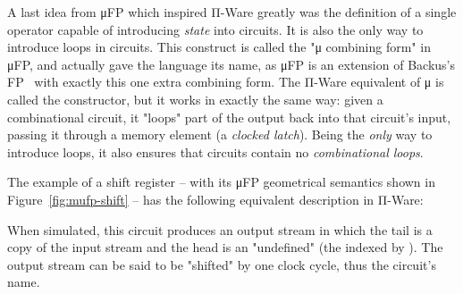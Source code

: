         A last idea from μFP which inspired Π-Ware greatly was the definition of a
        single operator capable of introducing \emph{state} into circuits.
        It is also the only way to introduce loops in circuits.
        This construct is called the "μ combining form" in μFP, and actually gave the language its name,
        as μFP is an extension of Backus's FP~\cite{backus-turing-lecture} with exactly this one
        extra combining form.
        The Π-Ware equivalent of μ is called the  constructor, but it works in exactly the same way:
        given a combinational circuit, it "loops" part of the output back into that circuit's input,
        passing it through a memory element (a \emph{clocked latch}).
        Being the \emph{only} way to introduce loops, it also ensures that circuits contain no
        \emph{combinational loops}.

        The example of a shift register – with its μFP geometrical semantics shown in
        Figure~\ref{fig:mufp-shift} – has the following equivalent description in Π-Ware:

        \begin{center}
        \end{center}

        When simulated, this circuit produces an output stream in which the tail is a copy of the
        input stream and the head is an "undefined"  (the  indexed by ).
        The output stream can be said to be "shifted" by one clock cycle, thus the circuit's name.




